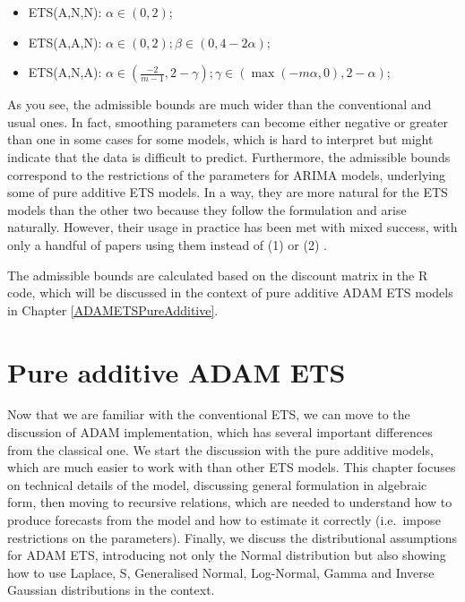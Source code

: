 \documentclass[
]{book}
\providecommand{\tightlist}{%
  \setlength{\itemsep}{0pt}\setlength{\parskip}{0pt}}
\theoremstyle{definition}
\theoremstyle{definition}
\theoremstyle{definition}
\theoremstyle{definition}
\theoremstyle{remark}
\begin{document}
\begin{itemize}
\tightlist
\item
  ETS(A,N,N): \(\alpha \in (0, 2)\);
\item
  ETS(A,A,N): \(\alpha \in (0, 2); \beta \in (0, 4-2\alpha)\);
\item
  ETS(A,N,A): \(\alpha \in \left(\frac{-2}{m-1}, 2-\gamma\right); \gamma \in (\max(-m\alpha, 0), 2-\alpha)\);
\end{itemize}

As you see, the admissible bounds are much wider than the conventional and usual ones. In fact, smoothing parameters can become either negative or greater than one in some cases for some models, which is hard to interpret but might indicate that the data is difficult to predict. Furthermore, the admissible bounds correspond to the restrictions of the parameters for ARIMA models, underlying some of pure additive ETS models. In a way, they are more natural for the ETS models than the other two because they follow the formulation and arise naturally. However, their usage in practice has been met with mixed success, with only a handful of papers using them instead of (1) or (2) \citetext{\citealp[e.g.][]{Gardner2008}; \citealp[mention that they appear in some cases and][ use them in their model]{Snyder2017}}.

The admissible bounds are calculated based on the discount matrix in the R code, which will be discussed in the context of pure additive ADAM ETS models in Chapter \ref{ADAMETSPureAdditive}.

\hypertarget{ADAMETSIntroduction}{%
\chapter{Pure additive ADAM ETS}\label{ADAMETSIntroduction}}

Now that we are familiar with the conventional ETS, we can move to the discussion of ADAM implementation, which has several important differences from the classical one. We start the discussion with the pure additive models, which are much easier to work with than other ETS models. This chapter focuses on technical details of the model, discussing general formulation in algebraic form, then moving to recursive relations, which are needed to understand how to produce forecasts from the model and how to estimate it correctly (i.e.~impose restrictions on the parameters). Finally, we discuss the distributional assumptions for ADAM ETS, introducing not only the Normal distribution but also showing how to use Laplace, S, Generalised Normal, Log-Normal, Gamma and Inverse Gaussian distributions in the context.
\end{document}
